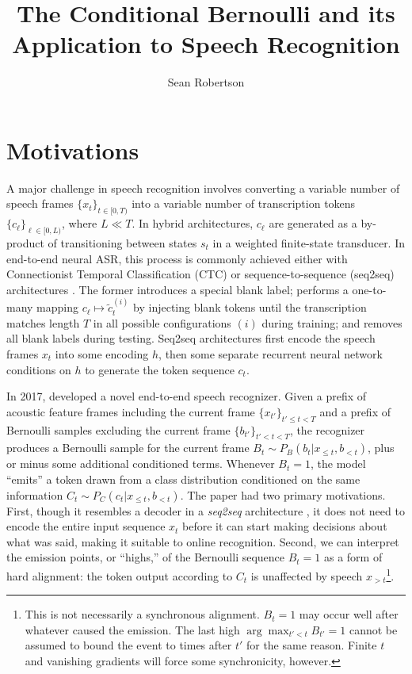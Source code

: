 \documentclass{article}
\title{The Conditional Bernoulli and its Application to Speech Recognition}
\author{Sean Robertson}
\begin{document}
\maketitle

\section{Motivations} \label{sec:motivations}

A major challenge in speech recognition involves converting a variable number
of speech frames $\{x_t\}_{t \in [0, T)}$ into a variable number of
transcription tokens $\{c_\ell\}_{\ell \in [0, L)}$, where $L \ll T$. In hybrid
architectures, $c_\ell$ are generated as a by-product of transitioning between
states $s_t$ in a weighted finite-state transducer. In end-to-end neural ASR,
this process is commonly achieved either with Connectionist Temporal
Classification (CTC) \cite{gravesConnectionistTemporalClassification2006} or
sequence-to-sequence (seq2seq) architectures
\cite{bahdanauNeuralMachineTranslation2015}. The former introduces a special
blank label; performs a one-to-many mapping $c_\ell \mapsto \tilde{c}_t^{(i)}$ by
injecting blank tokens until the transcription matches length $T$ in all
possible configurations $(i)$ during training; and removes all blank labels
during testing. Seq2seq architectures first encode the speech frames $x_t$ into
some encoding $h$, then some separate recurrent neural network conditions on
$h$ to generate the token sequence $c_t$.

In 2017, \citeauthor{luoLearningOnlineAlignments2017} developed a novel
end-to-end speech recognizer. Given a prefix of acoustic feature frames
including the current frame $\{x_{t'}\}_{t' \leq t < T}$ and a prefix of
Bernoulli samples excluding the current frame $\{b_{t'}\}_{t' < t < T}$, the
recognizer produces a Bernoulli sample for the current frame $B_t \sim
P_B(b_t|x_{\leq t}, b_{<t})$, plus or minus some additional conditioned terms.
Whenever $B_t = 1$, the model ``emits'' a token drawn from a class distribution
conditioned on the same information $C_t \sim P_C(c_t|x_{\leq t}, b_{<t})$. The
paper had two primary motivations. First, though it resembles a decoder in a
\textit{seq2seq} architecture \cite{bahdanauNeuralMachineTranslation2015}, it
does not need to encode the entire input sequence $x_t$ before it can
start making decisions about what was said, making it suitable to online
recognition. Second, we can interpret the emission points, or ``highs,'' of the
Bernoulli sequence $B_t = 1$ as a form of hard alignment: the token output
according to $C_t$ is unaffected by speech $x_{>t}$\footnote{
%
    This is not necessarily a synchronous alignment. $B_t = 1$ may occur well
    after whatever caused the emission. The last high $\arg\max_{t' < t} B_{t'}
    = 1$ cannot be assumed to bound the event to times after $t'$ for the same
    reason. Finite $t$ and vanishing gradients will force some synchronicity,
    however.
%
}.
\end{document}
